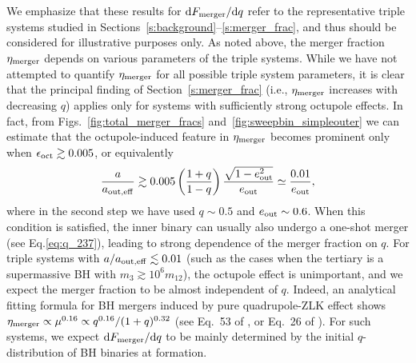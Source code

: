 \documentclass[
        fleqn,
        usenatbib,
    ]{mnras}
\newcommand*{\md}[0]{\mathrm{d}}
\begin{document}
We emphasize that these results for $\md F_{\rm merger}/\md q$ refer to the
representative triple systems studied in
Sections~\ref{s:background}--\ref{s:merger_frac}, and thus should be considered
for illustrative purposes only. As noted above, the merger fraction $\eta_{\rm
merger}$ depends on various parameters of the triple systems. While we have not
attempted to quantify $\eta_{\rm merger}$ for all possible triple system
parameters, it is clear that the principal finding of
Section~\ref{s:merger_frac} (i.e., $\eta_{\rm merger}$ increases with decreasing
$q$) applies only for systems with sufficiently strong octupole effects. In
fact, from Figs.~\ref{fig:total_merger_fracs} and~\ref{fig:sweepbin_simpleouter}
we can estimate that the octupole-induced feature in $\eta_{\rm merger}$ becomes
prominent only when $\epsilon_{\rm oct}\gtrsim 0.005$, or equivalently
\begin{equation}
  {a\over a_{\rm out,eff}} \gtrsim
    0.005 \left({1+q\over 1-q}\right){\sqrt{1-e_{\rm out}^2}\over e_{\rm out}}
\simeq {0.01 \over e_{\rm out}},
    \label{eq:new}
\end{equation}
where in the second step we have used $q\sim 0.5$ and $e_{\rm out}\sim 0.6$.
When this condition is satisfied, the inner binary can usually also undergo a
one-shot merger (see Eq.\ref{eq:q_237}), leading to strong dependence of the
merger fraction on $q$. For triple systems with $a/a_{\rm out,eff}\lesssim 0.01$
(such as the cases when the tertiary is a supermassive BH with $m_3\gtrsim 10^6
m_{12}$), the octupole effect is unimportant, and we expect the merger fraction
to be almost independent of $q$. Indeed, an analytical fitting formula for BH
mergers induced by pure quadrupole-ZLK effect shows $\eta_{\rm merger}\propto
\mu^{0.16} \propto q^{0.16}/(1+q)^{0.32}$ (see Eq.~53 of \citealp{LL18}, or
Eq.~26 of \citealp{bin_misc1}). For such systems, we expect $\md F_{\rm
merger}/\md q$ to be mainly determined by the initial $q$-distribution of BH
binaries at formation.
\end{document}

